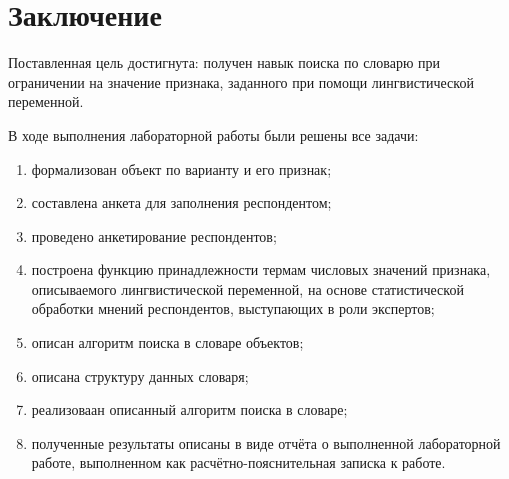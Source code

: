 \chapter*{Заключение}

Поставленная цель достигнута: получен навык поиска по словарю при ограничении на значение признака, заданного при помощи лингвистической переменной.

В ходе выполнения лабораторной работы были решены все задачи:

\begin{enumerate}[label=\arabic*)]
	\item формализован объект по варианту и его признак;
	\item составлена анкета для заполнения респондентом;
	\item проведено анкетирование респондентов;
	\item построена функцию принадлежности термам числовых значений признака, описываемого лингвистической переменной, на основе статистической обработки мнений респондентов, выступающих в роли экспертов;
	\item описан алгоритм поиска в словаре объектов;
	\item описана структуру данных словаря;
	\item реализоваан описанный алгоритм поиска в словаре;
	\item полученные результаты описаны в виде отчёта о выполненной лабораторной работе, выполненном как расчётно-пояснительная записка к работе.
\end{enumerate}

